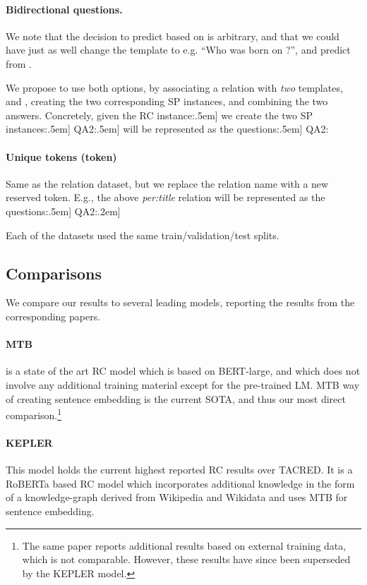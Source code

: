 \documentclass[11pt]{article}
\begin{document}
\paragraph{Bidirectional questions.}
We note that the decision to predict  based on  is arbitrary, and that we could have just as well change the template to e.g. ``Who was born on \underline{\hspace{1em}}?'', and predict  from .

We propose to use both options, by associating a relation  with \emph{two} templates,  and , creating the two corresponding SP instances, and combining the two answers. Concretely, given the RC instance:\0.5em] we create the two SP instances:\0.5em]
\indent QA2:\0.5em] will be represented as the questions:\0.5em]
\indent QA2:
\paragraph{Unique tokens (token)} Same as the relation dataset, but we replace the relation name with a new reserved token. E.g., the above \emph{per:title} relation will be represented as the questions:\0.5em]
\indent QA2:\0.2em]

Each of the datasets used the same train/validation/test splits. 

\subsection{Comparisons}
We compare our results to several leading models, reporting the results from the corresponding papers.
\paragraph{MTB} \cite{Soares2019} is a state of the art RC model which is based on BERT-large, and which does not involve any additional training material except for the pre-trained LM. MTB way of creating sentence embedding is the current SOTA, and thus our most direct comparison.\footnote{The same paper reports additional results based on external training data, which is not comparable. However, these results have since been superseded by the KEPLER model.}

\paragraph{KEPLER} \cite{Wang2019} 
This model holds the current highest reported RC results over TACRED.
It is a RoBERTa based RC model which incorporates additional knowledge in the form of a knowledge-graph derived from Wikipedia and Wikidata and uses MTB for sentence embedding. 
\end{document}
